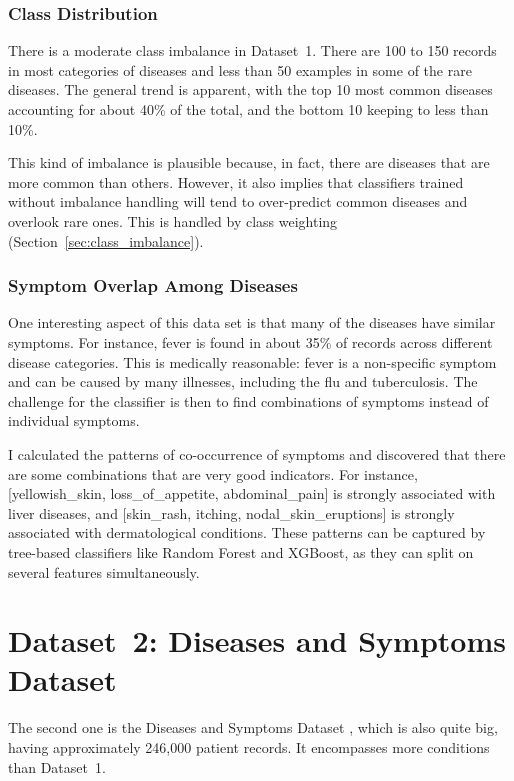 \subsubsection{Class Distribution}

There is a moderate class imbalance in Dataset~1. There are 100 to 150 records in most categories of diseases and less than 50 examples in some of the rare diseases. The general trend is apparent, with the top 10 most common diseases accounting for about 40\% of the total, and the bottom 10 keeping to less than 10\%.

This kind of imbalance is plausible because, in fact, there are diseases that are more common than others. However, it also implies that classifiers trained without imbalance handling will tend to over-predict common diseases and overlook rare ones. This is handled by class weighting (Section~\ref{sec:class_imbalance}).

\subsubsection{Symptom Overlap Among Diseases}

One interesting aspect of this data set is that many of the diseases have similar symptoms. For instance, fever is found in about 35\% of records across different disease categories. This is medically reasonable: fever is a non-specific symptom and can be caused by many illnesses, including the flu and tuberculosis. The challenge for the classifier is then to find combinations of symptoms instead of individual symptoms.

I calculated the patterns of co-occurrence of symptoms and discovered that there are some combinations that are very good indicators. For instance, [yellowish\_skin, loss\_of\_appetite, abdominal\_pain] is strongly associated with liver diseases, and [skin\_rash, itching, nodal\_skin\_eruptions] is strongly associated with dermatological conditions. These patterns can be captured by tree-based classifiers like Random Forest and XGBoost, as they can split on several features simultaneously.

\section{Dataset~2: Diseases and Symptoms Dataset}
\label{sec:dataset2}

The second one is the Diseases and Symptoms Dataset \citep{Kaggle_Diseases2023}, which is also quite big, having approximately 246,000 patient records. It encompasses more conditions than Dataset~1.

